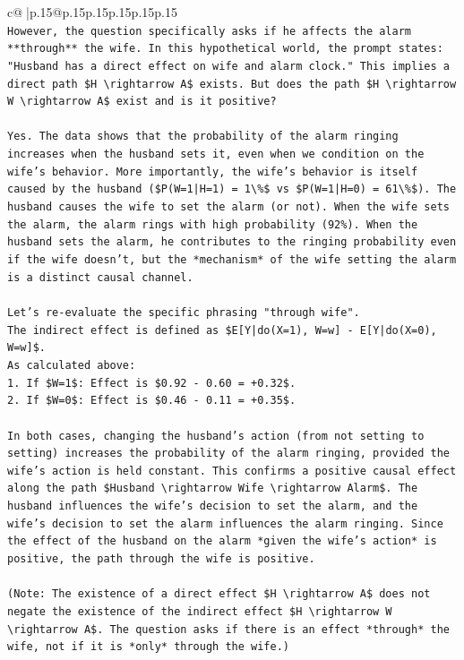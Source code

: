 \documentclass{article}
\begin{document}
{\begin{supertabular}{c@{$\;$}|p{.15\linewidth}@{}p{.15\linewidth}p{.15\linewidth}p{.15\linewidth}p{.15\linewidth}p{.15\linewidth}}
{{{\\ 
\texttt{However, the question specifically asks if he affects the alarm **through** the wife. In this hypothetical world, the prompt states: "Husband has a direct effect on wife and alarm clock." This implies a direct path \$H \textbackslash{}rightarrow A\$ exists. But does the path \$H \textbackslash{}rightarrow W \textbackslash{}rightarrow A\$ exist and is it positive?} \\
\\ 
\texttt{Yes. The data shows that the probability of the alarm ringing increases when the husband sets it, even when we condition on the wife's behavior. More importantly, the wife's behavior is itself caused by the husband (\$P(W=1|H=1) = 1\textbackslash{}\%\$ vs \$P(W=1|H=0) = 61\textbackslash{}\%\$). The husband causes the wife to set the alarm (or not). When the wife sets the alarm, the alarm rings with high probability (92\%). When the husband sets the alarm, he contributes to the ringing probability even if the wife doesn't, but the *mechanism* of the wife setting the alarm is a distinct causal channel.} \\
\\ 
\texttt{Let's re{-}evaluate the specific phrasing "through wife".} \\
\texttt{The indirect effect is defined as \$E{[}Y|do(X=1), W=w{]} {-} E{[}Y|do(X=0), W=w{]}\$.} \\
\texttt{As calculated above:} \\
\texttt{1.  If \$W=1\$: Effect is \$0.92 {-} 0.60 = +0.32\$.} \\
\texttt{2.  If \$W=0\$: Effect is \$0.46 {-} 0.11 = +0.35\$.} \\
\\ 
\texttt{In both cases, changing the husband's action (from not setting to setting) increases the probability of the alarm ringing, provided the wife's action is held constant. This confirms a positive causal effect along the path \$Husband \textbackslash{}rightarrow Wife \textbackslash{}rightarrow Alarm\$. The husband influences the wife's decision to set the alarm, and the wife's decision to set the alarm influences the alarm ringing. Since the effect of the husband on the alarm *given the wife's action* is positive, the path through the wife is positive.} \\
\\ 
\texttt{(Note: The existence of a direct effect \$H \textbackslash{}rightarrow A\$ does not negate the existence of the indirect effect \$H \textbackslash{}rightarrow W \textbackslash{}rightarrow A\$. The question asks if there is an effect *through* the wife, not if it is *only* through the wife.)} \\
}}}
\end{supertabular}}
\end{document}
